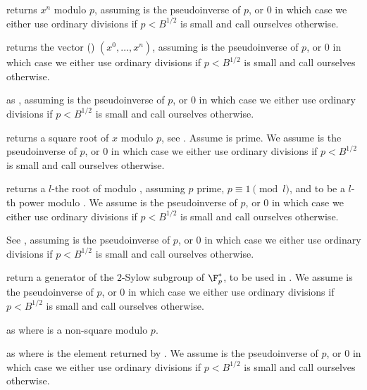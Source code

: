  returns
$x^n$ modulo $p$, assuming  is the pseudoinverse of $p$, or $0$
in which case we either use ordinary divisions if $p < B^{1/2}$ is small
and call  ourselves otherwise.

 returns
the vector () $(x^0, \dots, x^n)$, assuming  is
the pseudoinverse of $p$, or $0$ in which case we either use ordinary
divisions if $p < B^{1/2}$ is small and call  ourselves
otherwise.

as , assuming  is the pseudoinverse of $p$, or $0$ in
which case we either use ordinary divisions if $p < B^{1/2}$ is small and
call  ourselves otherwise.

 returns a square root
of $x$ modulo $p$, see . Assume  is prime. We assume
 is the pseudoinverse of $p$, or $0$ in which case we either use
ordinary divisions if $p < B^{1/2}$ is small and call 
ourselves otherwise.

returns a $l$-the root of  modulo , assuming
$p$ prime, $p \equiv 1 \pmod{l}$, and  to be a $l$-th power modulo
. We assume  is the pseudoinverse of $p$, or $0$ in which case
we either use ordinary divisions if $p < B^{1/2}$ is small and call
 ourselves otherwise.

See , assuming  is the pseudoinverse of $p$, or $0$ in
which case we either use ordinary divisions if $p < B^{1/2}$ is small and
call  ourselves otherwise.

 return a generator of
the $2$-Sylow subgroup of $\F_p^*$, to be used in .
We assume  is the pseudoinverse of $p$, or $0$ in which case we
either use ordinary divisions if $p < B^{1/2}$ is small and call
 ourselves otherwise.

as  where  is a non-square modulo $p$.

as  where  is the element returned by
. We assume  is the pseudoinverse of $p$, or $0$
in which case we either use ordinary divisions if $p < B^{1/2}$ is small and
call  ourselves otherwise.

